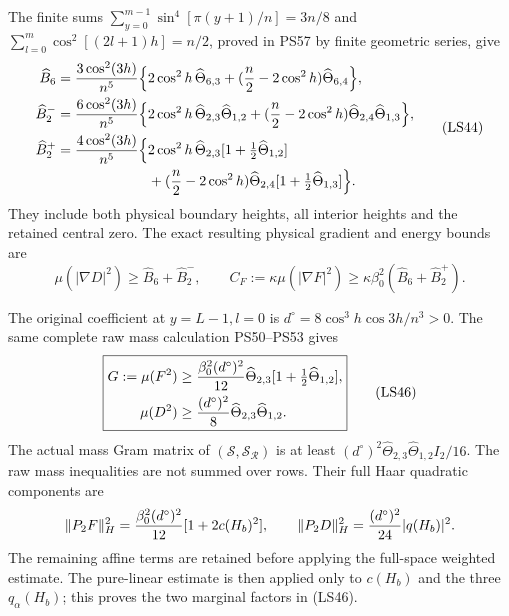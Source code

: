 \documentclass[11pt]{article}
\begin{document}
The finite sums
\(\sum_{y=0}^{m-1}\sin^4[\pi(y+1)/n]=3n/8\) and
\(\sum_{l=0}^{m}\cos^2[(2l+1)h]=n/2\), proved in PS57 by
finite geometric series, give
\[
 \begin{aligned}
 \widehat B_6={3\cos^2(3h)\over n^5}
 \Big\{&2\cos^2h\,\widehat\Theta_{6,3}
       +({n\over2}-2\cos^2h)\widehat\Theta_{6,4}\Big\},\\
 \widehat B_2^-={6\cos^2(3h)\over n^5}
 \Big\{&2\cos^2h\,\widehat\Theta_{2,3}\widehat\Theta_{1,2}
       +({n\over2}-2\cos^2h)
                         \widehat\Theta_{2,4}\widehat\Theta_{1,3}\Big\},\\
 \widehat B_2^+={4\cos^2(3h)\over n^5}
 \Big\{&2\cos^2h\,\widehat\Theta_{2,3}
                                   [1+\tfrac12\widehat\Theta_{1,2}]\\
       &+({n\over2}-2\cos^2h)\widehat\Theta_{2,4}
                                   [1+\tfrac12\widehat\Theta_{1,3}]\Big\}.
 \end{aligned}
 \tag{LS44}
\]
They include both physical boundary heights, all interior heights
and the retained central zero. The exact resulting physical
gradient and energy bounds are
\[
 \boxed{\mu(|\nabla D|^2)\ge\widehat B_6+\widehat B_2^-,
 \qquad C_F:=\kappa\mu(|\nabla F|^2)
             \ge\kappa\beta_0^2(\widehat B_6+\widehat B_2^+).}
 \tag{LS45}
\]

The original coefficient at \(y=L-1,l=0\) is
\(d^\circ=8\cos^3h\cos3h/n^3>0\). The same complete raw mass
calculation PS50–PS53 gives
\[
 \boxed{\begin{aligned}
 G:=\mu(F^2)&\ge{\beta_0^2(d^\circ)^2\over12}
                    \widehat\Theta_{2,3}
                                  [1+\tfrac12\widehat\Theta_{1,2}],\\
 \mu(D^2)&\ge{(d^\circ)^2\over8}
                           \widehat\Theta_{2,3}\widehat\Theta_{1,2}.
 \end{aligned}}
 \tag{LS46}
\]
The actual mass Gram matrix of
\((\mathcal S,\mathcal S_{\mathcal R})\) is at least
\((d^\circ)^2\widehat\Theta_{2,3}\widehat\Theta_{1,2}I_2/16\).
The raw mass inequalities are not summed over rows.
Their full Haar quadratic components are
\[
 \|P_2F\|_H^2={\beta_0^2(d^\circ)^2\over12}
                        [1+2c(H_b)^2],\qquad
 \|P_2D\|_H^2={(d^\circ)^2\over24}|q(H_b)|^2.
 \]
The remaining affine terms are retained before applying the
full-space weighted estimate. The pure-linear estimate is then
applied only to \(c(H_b)\) and the three \(q_\alpha(H_b)\);
this proves the two marginal factors in (LS46).
\end{document}
